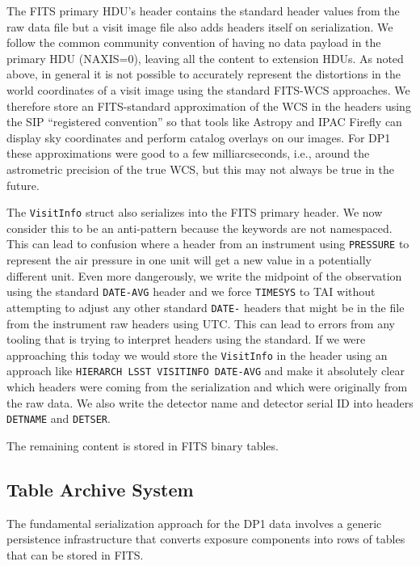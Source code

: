 The FITS primary HDU's header contains the standard header values from the raw data file\cite{CTN-004} but a visit image file also adds headers itself on serialization.
We follow the common community convention of having no data payload in the primary HDU (NAXIS=0), leaving all the content to extension HDUs.
As noted above, in general it is not possible to accurately represent the distortions in the world coordinates of a visit image using the standard FITS-WCS approaches.
We therefore store an FITS-standard approximation of the WCS in the headers using the SIP ``registered convention''\cite{2005ASPC..347..491S} so that tools like Astropy\cite{2013A&A...558A..33A} and IPAC Firefly\cite{2019ASPC..521...32W} can display sky coordinates and perform catalog overlays on our images.
For DP1 these approximations were good to a few milliarcseconds, i.e., around the astrometric precision of the true WCS, but this may not always be true in the future.

The \texttt{VisitInfo} struct also serializes into the FITS primary header.
We now consider this to be an anti-pattern because the keywords are not namespaced.
This can lead to confusion where a header from an instrument using \texttt{PRESSURE} to represent the air pressure in one unit will get a new value in a potentially different unit.
Even more dangerously, we write the midpoint of the observation using the standard \texttt{DATE-AVG} header and we force \texttt{TIMESYS} to TAI without attempting to adjust any other standard \texttt{DATE-} headers that might be in the file from the instrument raw headers using UTC.
This can lead to errors from any tooling that is trying to interpret headers using the standard.
If we were approaching this today we would store the \texttt{VisitInfo} in the header using an approach like \texttt{HIERARCH LSST VISITINFO DATE-AVG} and make it absolutely clear which headers were coming from the serialization and which were originally from the raw data.
We also write the detector name and detector serial ID into headers \texttt{DETNAME} and \texttt{DETSER}.

The remaining content is stored in FITS binary tables.

\subsection{Table Archive System}

The fundamental serialization approach for the DP1 data involves a generic persistence infrastructure that converts exposure components into rows of tables that can be stored in FITS.

